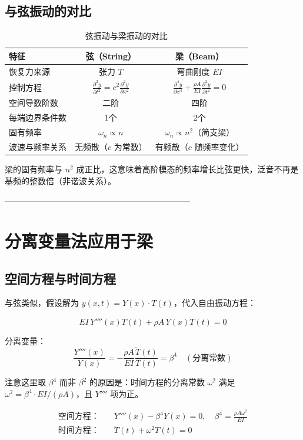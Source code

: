 \subsection{与弦振动的对比}

\begin{table}[H]\centering
\caption{弦振动与梁振动的对比}
\label{tab:string-vs-beam}
\begin{tabular}{lcc}
\toprule
特征 & 弦（String） & 梁（Beam） \\
\midrule
恢复力来源 & 张力 $T$ & 弯曲刚度 $EI$ \\
控制方程 & $\frac{\partial^2 y}{\partial t^2}=c^2\frac{\partial^2 y}{\partial x^2}$ & $\frac{\partial^4 y}{\partial x^4}+\frac{\rho A}{EI}\frac{\partial^2 y}{\partial t^2}=0$ \\
空间导数阶数 & 二阶 & 四阶 \\
每端边界条件数 & 1个 & 2个 \\
固有频率 & $\omega_n \propto n$ & $\omega_n \propto n^2$（简支梁） \\
波速与频率关系 & 无频散（$c$ 为常数） & 有频散（$c$ 随频率变化） \\
\bottomrule
\end{tabular}
\end{table}

梁的固有频率与 $n^2$ 成正比，这意味着高阶模态的频率增长比弦更快，泛音不再是基频的整数倍（非谐波关系）。

--------------------------------------------------------------------
\section{分离变量法应用于梁}

\subsection{空间方程与时间方程}

与弦类似，假设解为 $y(x,t) = Y(x) \cdot T(t)$，代入自由振动方程：

\[
EI\,Y''''(x)T(t) + \rho A\,Y(x)\ddot{T}(t) = 0
\]

分离变量：
\[
\frac{Y''''(x)}{Y(x)} = -\frac{\rho A}{EI}\frac{\ddot{T}(t)}{T(t)} = \beta^4 \quad (\text{分离常数})
\]

注意这里取 $\beta^4$ 而非 $\beta^2$ 的原因是：时间方程的分离常数 $\omega^2$ 满足 $\omega^2 = \beta^4 \cdot EI/(\rho A)$，且 $Y''''$ 项为正。

\begin{myformula}
\[\begin{aligned}
\text{空间方程：}\quad & Y''''(x) - \beta^4 Y(x) = 0, \quad \beta^4 = \frac{\rho A \omega^2}{EI} \\
\text{时间方程：}\quad & \ddot{T}(t) + \omega^2 T(t) = 0
\end{aligned}\]
\end{myformula}

